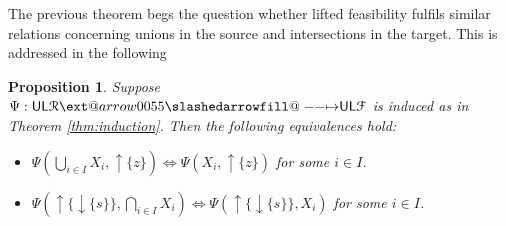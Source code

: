 \documentclass[12pt]{article}
\makeatletter
\theoremstyle{definition}
\theoremstyle{plain}
\theoremstyle{plain}
\newtheorem{proposition}[definition]{Proposition}
\theoremstyle{plain}
\theoremstyle{plain}
\theoremstyle{remark}
\theoremstyle{remark}
\newcommand{\mc}[1]{\mathcal{#1}}
\newcommand{\low}{\mathsf{L}}
\newcommand{\upper}{\mathsf{U}}
\newcommand{\upc}[1]{{\uparrow #1}}
\newcommand{\lwc}[1]{{\downarrow #1}}
\def\slashedarrowfill@#1#2#3#4#5{%
	$\m@th\thickmuskip0mu\medmuskip\thickmuskip\thinmuskip\thickmuskip
	\relax#5#1\mkern-7mu%
	\cleaders\hbox{$#5\mkern-2mu#2\mkern-2mu$}\hfill
	\mathclap{#3}\mathclap{#2}%
	\cleaders\hbox{$#5\mkern-2mu#2\mkern-2mu$}\hfill
	\mkern-7mu#4$%
}
\def\rightslashedarrowfill@{%
	\slashedarrowfill@\relbar\relbar\mapstochar\rightarrow}
\newcommand\xslashedrightarrow[2][]{%
	\ext@arrow 0055{\rightslashedarrowfill@}{#1}{#2}}
\makeatother
\begin{document}
\newpage
The previous theorem begs the question whether lifted feasibility fulfils similar relations concerning unions in the source and intersections in the target. This is addressed in the following
\begin{proposition}\label{prop:union intersection}
	Suppose $\Psi: \upper\low\mc{R} \xslashedrightarrow{} \upper\low\mc{F}$ is induced as in Theorem \ref{thm:induction}. Then the following equivalences hold: 
	\begin{itemize}
		\item[(i)] $\Psi(\bigcup_{i \in I} X_i, \upc{\{z\}}) \Leftrightarrow \Psi(X_i,\upc{\{z\}})$ for some $i \in I$.
		\item[(ii)] $\Psi(\upc{\{\lwc{\{s\}}\}}, \bigcap_{i \in I}X_i) \Leftrightarrow \Psi(\upc{\{\lwc{\{s\}}\}},X_i)$ for some $i \in I$.
	\end{itemize}
\end{proposition}
\end{document}
